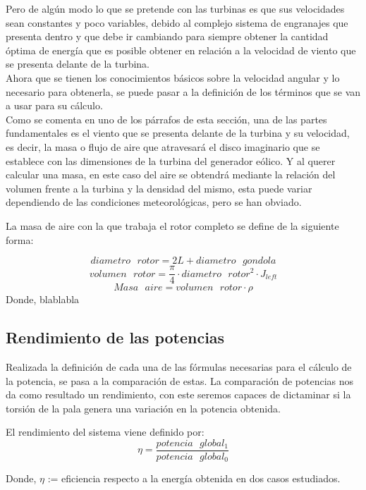 Pero de algún modo lo que se pretende con las turbinas es que sus velocidades sean constantes y poco variables, debido al complejo sistema de engranajes que presenta dentro y que debe ir cambiando para siempre obtener la cantidad óptima de energía que es posible obtener en relación a la velocidad de viento que se presenta delante de la turbina.\\

Ahora que se tienen los conocimientos básicos sobre la velocidad angular y lo necesario para obtenerla, se puede pasar a la definición de los términos que se van a usar para su cálculo.\\

Como se comenta en uno de los párrafos de esta sección, una de las partes fundamentales es el viento que se presenta delante de la turbina y su velocidad, es decir, la masa o flujo de aire que atravesará el disco imaginario que se establece con las dimensiones de la turbina del generador eólico. Y al querer calcular una masa, en este caso del aire se obtendrá mediante la relación del volumen frente a la turbina y la densidad del mismo, esta puede variar dependiendo de las condiciones meteorológicas, pero se han obviado.\\

    \begin{definicion}
    La masa de aire con la que trabaja el rotor completo se define de la siguiente forma:
    
    $$ diametro \text{ } rotor = 2L + diametro \text{ } gondola $$
    $$ volumen \text{ } rotor = \dfrac{\pi}{4} \cdot diametro \text{ } rotor^2 \cdot J_{left} $$
    $$ Masa \text{ } aire = volumen \text{ } rotor \cdot \rho $$
    Donde, blablabla
    \centering 
    \label{def:masa_aire}
    \end{definicion}



 \subsection{Rendimiento de las potencias}
 \label{section:rendimiento}
 
Realizada la definición de cada una de las fórmulas necesarias para el cálculo de la potencia, se pasa a la comparación de estas. La comparación de potencias nos da como resultado un rendimiento, con este seremos capaces de dictaminar si la torsión de la pala genera una variación en la potencia obtenida.
 
   \begin{definicion}
El rendimiento del sistema viene definido por:
 $$ \eta = \dfrac{potencia \text{ } global_1}{potencia \text{ } global_0} $$ 
 
 Donde,
  \centering $\eta$ := eficiencia respecto a la energía obtenida en dos casos estudiados.
 \label{def:rendimiento_potencias}
 \end{definicion}
 
